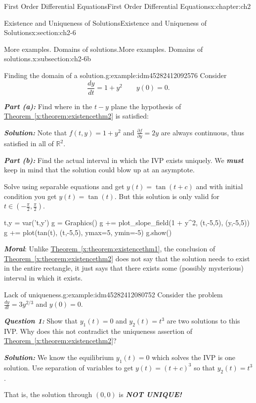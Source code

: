 \documentclass[oneside,10pt,]{book}
\newcommand{\alert}[1]{\textbf{\textit{#1}}}
\numberwithin{equation}{section}
\numberwithin{equation}{section}
\begin{document}
\begin{chapterptx}{First Order Differential Equations}{}{First Order Differential Equations}{}{}{x:chapter:ch2}
\begin{sectionptx}{Existence and Uniqueness of Solutions}{}{Existence and Uniqueness of Solutions}{}{}{x:section:ch2-6}
\begin{subsectionptx}{More examples. Domains of solutions.}{}{More examples. Domains of solutions.}{}{}{x:subsection:ch2-6b}
\begin{example}{Finding the domain of a solution.}{g:example:idm45282412092576}%
Consider%
\begin{equation*}
\frac{dy}{dt}=1+y^{2}\qquad y(0)=0.
\end{equation*}
%
\par
\alert{Part (a):} Find where in the \(t-y\) plane the hypothesis of \hyperref[x:theorem:existencethm2]{Theorem~\ref{x:theorem:existencethm2}} is satisfied:%
\par
\alert{Solution:} Note that \(f(t,y)=1+y^{2}\) and \(\frac{\partial f}{\partial y}=2y\) are always continuous, thus satisfied in all of \(\mathbb{R}^{2}\).%
\par
\alert{Part (b):} Find the actual interval in which the IVP exists uniquely. We \alert{must} keep in mind that the solution could blow up at an asymptote.%
\par
Solve using separable equations and get \(y(t)=\tan(t+c)\) and with initial condition you get \(y(t)=\tan(t)\). But this solution is only valid for \(t\in\left(-\frac{\pi}{2},\frac{\pi}{2}\right)\).%
\begin{sageinput}
t,y = var('t,y')
g = Graphics()
g += plot_slope_field(1 + y^2, (t,-5,5), (y,-5,5))
g += plot(tan(t), (t,-5,5), ymax=5, ymin=-5)
g.show()
\end{sageinput}
\alert{Moral}: Unlike \hyperref[x:theorem:existencethm1]{Theorem~\ref{x:theorem:existencethm1}}, the conclusion of \hyperref[x:theorem:existencethm2]{Theorem~\ref{x:theorem:existencethm2}} does not say that the solution needs to exist in the entire rectangle, it just says that there exists some (possibly mysterious) interval in which it exists.%
\end{example}
\begin{example}{Lack of uniqueness.}{g:example:idm45282412080752}%
Consider the problem \(\frac{dy}{dt}=3y^{2/3}\) and \(y(0)=0\).%
\par
\alert{Question 1:} Show that \(y_{1}(t)=0\) and \(y_{2}(t)=t^{3}\) are two solutions to this IVP. Why does this not contradict the uniqueness assertion of \hyperref[x:theorem:existencethm2]{Theorem~\ref{x:theorem:existencethm2}}?%
\par
\alert{Solution:} We know the equilibrium \(y_{1}(t)=0\) which solves the IVP is one solution. Use separation of variables to get \(y(t)=(t+c)^{3}\) so that \(y_{2}(t)=t^{3}\).%
\par
That is, the solution through \((0,0)\) is \alert{NOT UNIQUE!}%
\par

\end{example}
\end{subsectionptx}
\end{sectionptx}
\end{chapterptx}
\end{document}
